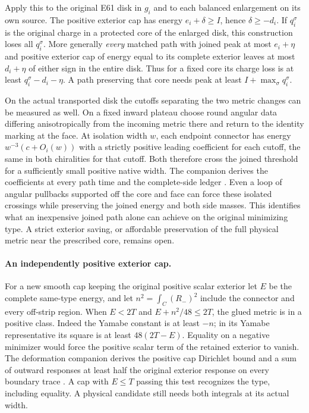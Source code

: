 \documentclass[11pt,letterpaper]{article}
\numberwithin{equation}{section}
\begin{document}
Apply this to the original E61 disk in \(g_i\) and to each
balanced enlargement on its own source. The positive exterior cap
has energy \(e_i+\delta\ge I\), hence \(\delta\ge-d_i\).
If \(q_i^\sigma\) is the original charge in a protected core of
the enlarged disk, this construction loses all \(q_i^\sigma\).
More generally \emph{every} matched path with joined peak at
most \(e_i+\eta\) and positive exterior cap of energy equal to its
complete exterior leaves at most \(d_i+\eta\) of either sign in
the entire disk. Thus for a fixed core its charge loss is at least
\(q_i^\sigma-d_i-\eta\). A path preserving that core needs peak
at least \(I+\max_\sigma q_i^\sigma\).

On the actual transported disk the cutoffs separating the two
metric changes can be measured as well. On a fixed inward plateau
choose round angular data differing anisotropically from the
incoming metric there and return to the identity marking at the
face. At isolation width \(w\), each endpoint connector has
energy \(w^{-3}(c+O_i(w))\) with a strictly positive leading
coefficient for each cutoff, the same in both chiralities for that
cutoff. Both therefore cross the joined threshold for a sufficiently
small positive native width. The companion derives the coefficients
at every path time and the complete-side ledger
\cite{Baker2026CollarDeformation}. Even a loop of angular
pullbacks supported off the core and face can force these isolated
crossings while preserving the joined energy and both side masses.
This identifies what an inexpensive joined path alone can achieve
on the original minimizing type. A strict exterior saving, or affordable preservation of the full physical metric near the prescribed core, remains open.

\paragraph{An independently positive exterior cap.}
For a new smooth cap keeping the original positive scalar exterior
let \(E\) be the complete same-type energy, and let
\(n^2=\int_C (R_-)^2\) include the connector and every off-strip
region. When \(E<2T\) and \(E+n^2/48\le2T\), the glued metric is
in a positive class. Indeed the Yamabe constant is at least \(-n\);
in its Yamabe representative its square is at least \(48(2T-E)\).
Equality on a negative minimizer would force the positive scalar
term of the retained exterior to vanish. The deformation companion
derives the positive cap Dirichlet bound and a sum of outward responses
at least half the original exterior response on every boundary
trace \cite{Baker2026CollarDeformation}. A cap with \(E\le T\)
passing this test recognizes the type, including equality. A physical
candidate still needs both integrals at its actual width.
\end{document}
